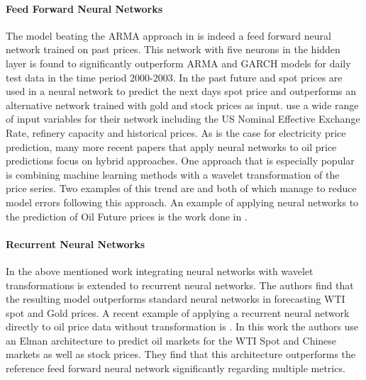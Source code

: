 \paragraph{Feed Forward Neural Networks}
The model beating the ARMA approach in \cite{moshiri_forecasting_2006} is indeed a feed forward neural network trained on past prices. This network with five neurons in the hidden layer is found to significantly outperform ARMA and GARCH models for daily test data in the time period 2000-2003. In \cite{haidar_forecasting_2008} the past future and spot prices are used in a neural network to predict the next days spot price and outperforms an alternative network trained with gold and stock prices as input. \cite{alizadeh_monthly_2010} use a wide range of input variables for their network including the US Nominal Effective Exchange Rate, refinery capacity and historical prices.  As is the case for electricity price prediction, many more recent papers that apply  neural networks to oil price predictions focus on hybrid approaches. One approach that is especially popular is combining machine learning methods with a wavelet transformation of the price series. Two examples of this trend are \citep{pang_forecasting_2011} and \cite{he_crude_2012} both of which manage to reduce model errors following this approach.
An example of applying neural networks to the prediction of Oil Future prices is the work done in  \cite{shambora_are_2007}.

\paragraph{Recurrent Neural Networks}
In \cite{mingming_multiple_2012} the above mentioned work integrating neural networks with wavelet transformations is extended to recurrent neural networks. The authors find that the resulting model outperforms standard neural networks in forecasting WTI spot and Gold prices. 
A recent example of applying a recurrent neural network directly to oil price data without transformation is \cite{wang_forecasting_2016}. In this work the authors use an Elman architecture to predict oil markets for the WTI Spot and Chinese markets as well as stock prices. They find that this architecture outperforms the reference feed forward neural network significantly regarding multiple metrics. 



